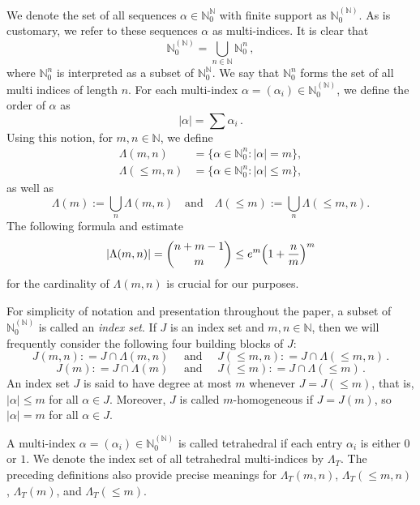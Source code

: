 \documentclass[12pt]{amsart}
\numberwithin{subsection}{section}
\theoremstyle{definition}
\theoremstyle{remark}
\begin{document}
We denote the set of all sequences \(\alpha \in \mathbb{N}_0^{\mathbb{N}}\) with finite support as \(\mathbb{N}_0^{(\mathbb{N})}\).
As is customary, we refer to these sequences \(\alpha\) as multi-indices. It is clear that
\[
\mathbb{N}_0^{(\mathbb{N})} = \bigcup_{n \in \mathbb{N}} \mathbb{N}_0^n\,,
\]
where  $\mathbb{N}_0^n$ is  interpreted as a subset of $\mathbb{N}_0^{\mathbb{N}}$. We say  that   $\mathbb{N}_0^n$  forms the  set
of all
multi indices of length $n$.  For each multi-index \( \alpha = (\alpha_i) \in \mathbb{N}_0^{(\mathbb{N})} \), we define the order of
\( \alpha \) as
\[
|\alpha| = \sum \alpha_i\,.
\]
Using this notion, for \( m,n \in \mathbb{N} \), we define
\begin{align*}
\Lambda(m,n) &= \big\{ \alpha \in \mathbb{N}_0^n \colon |\alpha| = m \big\}, \\
\Lambda(\leq m,n) &= \big\{ \alpha \in \mathbb{N}_0^n \colon |\alpha| \leq m \big\},
\end{align*}
as well as
\[
\Lambda(m) := \bigcup_n \Lambda(m,n) \quad \text{and} \quad \Lambda(\leq m) := \bigcup_n \Lambda(\leq m,n).
\]
The following  formula and estimate
\begin{equation} \label{cardi}
|\Lambda(m,n)| = \dbinom{n+m-1}{m}\leq e^m \Big( 1 + \frac{n}{m}\Big)^m
\end{equation}
for the cardinality of $\Lambda(m,n)$ is crucial for our purposes.

For simplicity of notation and presentation throughout the paper, a subset of \(\mathbb{N}_0^{(\mathbb{N})}\) is called an \textit{index set}.
If \(J\) is an index set and \(m,n \in \mathbb{N}\), then we will frequently consider the following four building blocks of \(J\):
\[
J(m,n) : = J \cap \Lambda(m,n) \quad \text{ and } \quad  J(\leq m,n) : = J \cap \Lambda(\leq m,n)\,.
\]
\[
J(m) : = J \cap \Lambda(m) \quad \text{ and } \quad  J(\leq m) : = J \cap \Lambda(\leq m)\,.
\]
An index set $J$ is said to have degree at most $m$ whenever $J = J (\leq m)$, that is, $|\alpha| \leq m$ for all $\alpha \in J$.
Moreover,  $J$ is  called  $m$-homogeneous if  $J = J (m)$, so  $|\alpha| = m$ for all $\alpha \in J$.

A multi-index \(\alpha = (\alpha_i) \in \mathbb{N}_0^{(\mathbb{N})}\) is called tetrahedral if each entry \(\alpha_i\) is either \(0\)
or \(1\).  We denote the index set of all tetrahedral multi-indices by \(\Lambda_T\). The preceding definitions also provide precise
meanings for \(\Lambda_T(m,n)\), \(\Lambda_T(\leq m,n)\), \(\Lambda_T(m)\), and \(\Lambda_T(\leq m)\).
\end{document}
